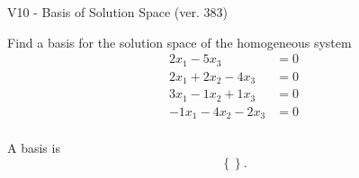 \begin{exercise}
  \begin{exerciseTitle}V10 - Basis of Solution Space (ver. 383)\end{exerciseTitle}
  \begin{exerciseStatement}
    Find a basis for the solution space of the homogeneous system 
\begin{align*}
 2 x_ 1 -5 x_ 3 &= 0  \\ 
  2 x_ 1 + 2 x_ 2 -4 x_ 3 &= 0  \\ 
  3 x_ 1 -1 x_ 2 + 1 x_ 3 &= 0  \\ 
  -1 x_ 1 -4 x_ 2 -2 x_ 3 &= 0  \\ 
 \end{align*}


 
  \end{exerciseStatement}

  \begin{exerciseAnswer}
   A basis is   
\[\left\{\right\}.\]

  


  \end{exerciseAnswer}
\end{exercise}